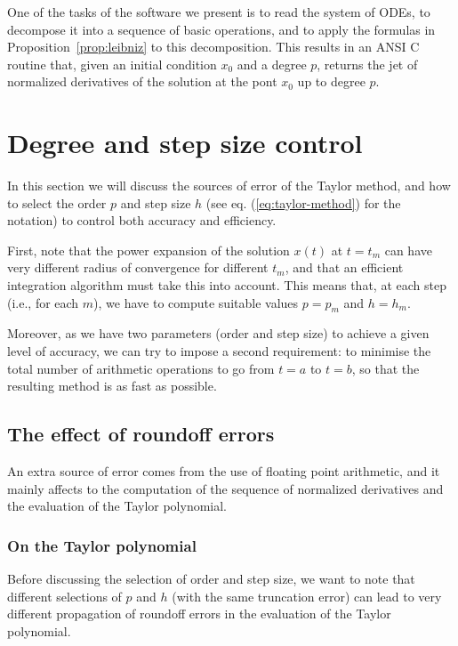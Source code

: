 \documentclass[12pt,twoside]{article}
\begin{document}
One of the tasks of the software we present is to read the system of
ODEs, to decompose it into a sequence of basic operations, and to
apply the formulas in Proposition~\ref{prop:leibniz} to this
decomposition. This results in an ANSI C routine that, given an
initial condition $x_0$ and a degree $p$, returns the jet of
normalized derivatives of the solution at the pont $x_0$ up to degree
$p$.


\section{Degree and step size control}\label{sec:dssc}
In this section we will discuss the sources of error of the Taylor
method, and how to select the order $p$ and step size $h$ (see eq.
(\ref{eq:taylor-method}) for the notation) to control both accuracy
and efficiency.

First, note that the power expansion of the solution $x(t)$ at $t=t_m$
can have very different radius of convergence for different $t_m$, and
that an efficient integration algorithm must take this into
account. This means that, at each step (i.e., for each $m$), we have
to compute suitable values $p=p_m$ and $h=h_m$.

Moreover, as we have two parameters (order and step size) to achieve a
given level of accuracy, we can try to impose a second requirement: to
minimise the total number of arithmetic operations to go from $t=a$ to
$t=b$, so that the resulting method is as fast as possible.

\subsection{The effect of roundoff errors}\label{sec:danger}
An extra source of error comes from the use of floating point
arithmetic, and it mainly affects to the computation of the sequence
of normalized derivatives and the evaluation of the Taylor
polynomial.

\subsubsection{On the Taylor polynomial}\label{sec:cancela}
Before discussing the selection of order and step size, we want to
note that different selections of $p$ and $h$ (with the same
truncation error) can lead to very different propagation of roundoff
errors in the evaluation of the Taylor polynomial.
\end{document}
